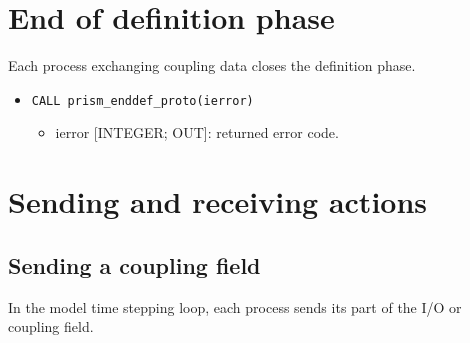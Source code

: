 \section{End of definition phase}
\label{subsubsec_Endofdefinition}
Each process exchanging coupling data closes the definition phase.
\begin{itemize}
\item {\tt CALL prism\_enddef\_proto(ierror)}
\begin{itemize}
  \item ierror [INTEGER; OUT]: returned error code.
\end{itemize}
\end{itemize}


\section{Sending and receiving actions}
\label{subsubsec_sendingreceiving}

\subsection{Sending a coupling field}
\label{prismput}

In the model time stepping loop, each process 
sends its part of the I/O or coupling field. 

